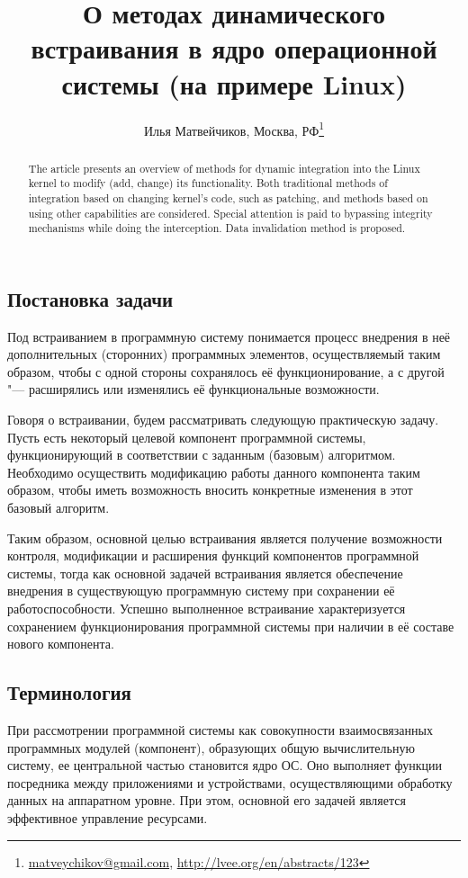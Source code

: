 \documentclass[10pt, a5paper]{article}
\begin{document}
\title{О методах динамического встраивания в ядро операционной системы (на примере Linux)}
\author{Илья Матвейчиков, Москва, РФ\footnote{\url{matveychikov@gmail.com}, \url{http://lvee.org/en/abstracts/123}}}
\maketitle
\begin{abstract}
The article presents an overview of methods for dynamic integ\-ration into the Linux kernel to modify (add, change) its functio\-nality. Both traditional methods of integration based on changing kernel's code, such as patching, and methods based on using other capabilities are considered. Special attention is paid to bypassing integrity mechanisms while doing the interception. Data invalidation method is proposed.
\end{abstract}
\subsection*{Постановка задачи}

Под встраиванием в программную систему понимается процесс внедрения в неё дополнительных (сторонних) программных элементов, осуществляемый таким образом, чтобы с одной стороны сохранялось её функционирование, а с другой "--- расширялись или изменялись её функциональные возможности.

Говоря о встраивании, будем рассматривать следующую практическую задачу. Пусть есть некоторый целевой компонент программной системы, функционирующий в соответствии с заданным (базовым) алгоритмом. Необходимо осуществить модификацию работы данного компонента таким образом, чтобы иметь возможность вносить конкретные изменения в этот базовый алгоритм.

Таким образом, основной целью встраивания является получение возможности контроля, модификации и расширения функций компонентов программной системы, тогда как основной задачей встраивания является обеспечение внедрения в существующую программную систему при сохранении её работоспособности. Успешно выполненное встраивание характеризуется сохранением функционирования программной системы при наличии в её составе нового компонента.

\subsection*{Терминология}

При рассмотрении программной системы как совокупности взаимосвязанных программных модулей (компонент), образующих общую вычислительную систему, ее центральной частью становится ядро ОС. Оно выполняет функции посредника между приложениями и устройствами, осуществляющими обработку данных на аппаратном уровне. При этом, основной его задачей является эффективное управление ресурсами.
\end{document}
